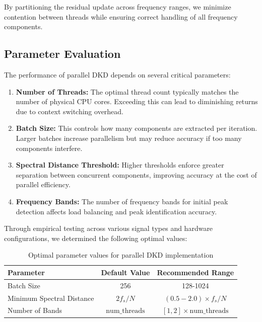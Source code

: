 \documentclass[11pt,twoside]{report}
\numberwithin{thm}{section}
\numberwithin{equation}{section}
\begin{document}
By partitioning the residual update across frequency ranges, we minimize contention between threads while ensuring correct handling of all frequency components.

\subsection{Parameter Evaluation}

The performance of parallel DKD depends on several critical parameters:

\begin{enumerate}
    \item \textbf{Number of Threads:} The optimal thread count typically matches the number of physical CPU cores. Exceeding this can lead to diminishing returns due to context switching overhead.
    
    \item \textbf{Batch Size:} This controls how many components are extracted per iteration. Larger batches increase parallelism but may reduce accuracy if too many components interfere.
    
    \item \textbf{Spectral Distance Threshold:} Higher thresholds enforce greater separation between concurrent components, improving accuracy at the cost of parallel efficiency.
    
    \item \textbf{Frequency Bands:} The number of frequency bands for initial peak detection affects load balancing and peak identification accuracy.
\end{enumerate}

Through empirical testing across various signal types and hardware configurations, we determined the following optimal values:

\begin{table}[h]
\centering
\begin{tabular}{|l|c|c|}
\hline
\textbf{Parameter} & \textbf{Default Value} & \textbf{Recommended Range} \\
\hline
Batch Size & 256 & 128-1024 \\
\hline
Minimum Spectral Distance & $2f_s/N$ & $(0.5-2.0) \times f_s/N$ \\
\hline
Number of Bands & $\text{num\_threads}$ & $[1, 2] \times \text{num\_threads}$ \\
\hline
\end{tabular}
\caption{Optimal parameter values for parallel DKD implementation}
\end{table}
\end{document}
